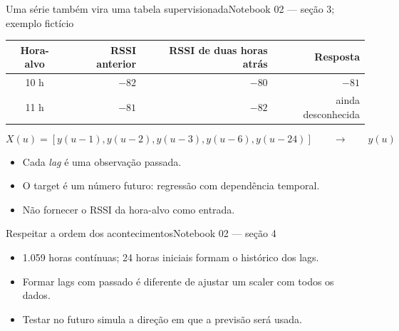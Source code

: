 \begin{frame}{Uma série também vira uma tabela supervisionada}{Notebook 02 — seção 3; exemplo fictício}
\centering
\begin{tabular}{c r r r}
\toprule
Hora-alvo & RSSI anterior & RSSI de duas horas atrás & Resposta\\
\midrule
10 h & $-82$ & $-80$ & $-81$\\
11 h & $-81$ & $-82$ & ainda desconhecida\\
\bottomrule
\end{tabular}
\vspace{4mm}
\[
X(u)=[y(u-1),y(u-2),y(u-3),y(u-6),y(u-24)]
\qquad\longrightarrow\qquad y(u)
\]
\begin{itemize}
\item Cada \emph{lag} é uma observação passada.
\item O target é um número futuro: regressão com dependência temporal.
\item Não fornecer o RSSI da hora-alvo como entrada.
\end{itemize}
\end{frame}

\begin{frame}{Respeitar a ordem dos acontecimentos}{Notebook 02 — seção 4}
\centering
{}
\vspace{4mm}
\begin{itemize}
\item 1.059 horas contínuas; 24 horas iniciais formam o histórico dos lags.
\item Formar lags com passado é diferente de ajustar um scaler com todos os dados.
\item Testar no futuro simula a direção em que a previsão será usada.
\end{itemize}
\end{frame}

